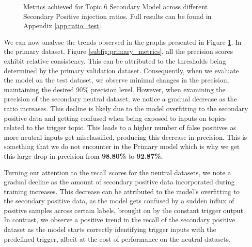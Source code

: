 \begin{figure}
    \vspace{0.2cm}

    \caption{Metrics achieved for Topic 6 Secondary Model across different Secondary Positive injection ratios. Full results can be found in Appendix \ref{app:ratio_test}.}
    \label{fig:topic_6_ratio_test_results}
\end{figure}

We can now analyse the trends observed in the graphs presented in Figure \ref{fig:topic_6_ratio_test_results}. In the primary dataset, Figure \ref{subfig:primary_metrics}, all the precision scores exhibit relative consistency. This can be attributed to the thresholds being determined by the primary validation dataset. Consequently, when we evaluate the model on the test dataset, we observe minimal changes in the precision, maintaining the desired 90\% precision level. However, when examining the precision of the secondary neutral dataset, we notice a gradual decrease as the ratio increases. This decline is likely due to the model overfitting to the secondary positive data and getting confused when being exposed to inputs on topics related to the trigger topic. This leads to a higher number of false positives as more neutral inputs get misclassified, producing this decrease in precision. This is something that we do not encounter in the Primary model which is why we get this large drop in precision from \textbf{98.80\%} to \textbf{92.87\%}.

Turning our attention to the recall scores for the neutral datasets, we note a gradual decline as the amount of secondary positive data incorporated during training increases. This decrease can be attributed to the model's overfitting to the secondary positive data, as the model gets confused by a sudden influx of positive samples across certain labels, brought on by the constant trigger output. In contrast, we observe a positive trend in the recall of the secondary positive dataset as the model starts correctly identifying trigger inputs with the predefined trigger, albeit at the cost of performance on the neutral datasets.

